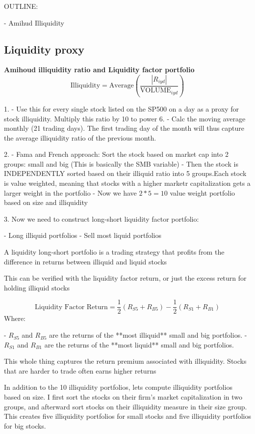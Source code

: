 OUTLINE:

- Amihud Illiquidity

\subsection{Liquidity proxy}

\textbf{Amihoud illiquidity ratio and Liquidity factor portfolio}
$$\text{Illiquidity} = \text{Average} \left( \frac{|R_{iyd}|}{\text{VOLUME}_{iyd}} \right)
$$


1.
- Use this for every single stock listed on the SP500 on a day as a proxy for stock illiquidity. Multiply this ratio by 10 to power 6. 
- Calc the moving average monthly (21 trading days). The first trading day of the month will thus capture the average illiquidity ratio of the previous month.

2.
- Fama and French approach: Sort the stock based on market cap into 2 groups: small and big (This is basically the SMB variable)
- Then the stock is INDEPENDENTLY sorted based on their illiquid ratio into 5 groups.Each stock is value weighted, meaning that stocks with a higher marketr capitalization gets a larger weight in the portfolio
- Now we have $2*5=10$ value weight portfolio based on size and illiquidity


3.
Now we need to construct long-short liquidity factor portfolio:

- Long illiquid portfolios
- Sell most liquid portfolios

A liquidity long-short portfolio is a trading strategy that profits from the difference in returns between illiquid and liquid stocks

This can be verified with the liquidity factor return, or just the excess return for holding illiquid stocks

$$
\text{Liquidity Factor Return} = \frac{1}{2} \left( R_{S5} + R_{B5} \right) - \frac{1}{2} \left( R_{S1} + R_{B1} \right)
$$
Where:

- \( R_{S5} \) and \( R_{B5} \) are the returns of the **most illiquid** small and big portfolios.
- \( R_{S1} \) and \( R_{B1} \) are the returns of the **most liquid** small and big portfolios.



This whole thing captures the return premium associated with illiquidity. Stocks that are harder to trade often earns higher returns


In addition to the 10 illiquidity portfolios, lets compute illiquidity portfolios based on size. I first sort the stocks on their firm’s market capitalization in two groups, and afterward sort stocks on their illiquidity measure in their size group. This creates five illiquidity portfolios for small stocks and five illiquidity portfolios for big stocks.

